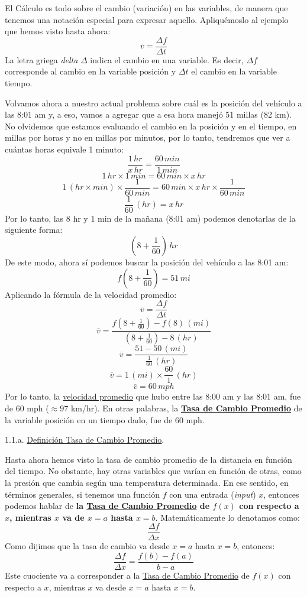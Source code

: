 \documentclass[12pt]{article}
\begin{document}
El Cálculo es todo sobre el cambio (variación) en las variables, de manera que tenemos una notación especial para expresar aquello. Apliquémoslo al ejemplo que hemos visto hasta ahora:
\[\overline{v} = \frac{\Delta f}{\Delta t}\]
La letra griega \textit{delta} $\Delta$ indica el cambio en una variable. Es decir, $\Delta f$ corresponde al cambio en la variable posición y $\Delta t$ el cambio en la variable tiempo.

Volvamos ahora a nuestro actual problema sobre cuál es la posición del vehículo a las 8:01 am y, a eso, vamos a agregar que a esa hora manejó 51 millas (82 km). No olvidemos que estamos evaluando el cambio en la posición y en el tiempo, en millas por horas y no en millas por minutos, por lo tanto, tendremos que ver a cuántas horas equivale 1 minuto:
\[\frac{1 \, hr}{x \, hr} = \frac{60 \, min}{1 \, min}\]
\[1 \, hr \times 1 \, min = 60 \, min \times x \, hr\]
\[1 \, (hr \times min) \times \frac{1}{60 \, min} = 60 \, min \times x \, hr \times \frac{1}{60 \, min}\]
\[\frac{1}{60} \, (hr) = x \, hr\]
Por lo tanto, las 8 hr y 1 min de la mañana (8:01 am) podemos denotarlas de la siguiente forma:
\[\left(8 + \frac{1}{60} \right) \, hr\]
De este modo, ahora sí podemos buscar la posición del vehículo a las 8:01 am:
\[f\left(8 + \frac{1}{60}\right) = 51 \, mi\]
Aplicando la fórmula de la velocidad promedio:
\[\overline{v} = \frac{\Delta f}{\Delta t}\]
\[\overline{v} = \frac{f\left(8 + \frac{1}{60}\right) - f(8) \, (mi)}{\left(8 + \frac{1}{60}\right) - 8 \, (hr)}\]
\[\overline{v} = \frac{51 - 50 \, (mi)}{\frac{1}{60} \, (hr)}\]
\[\overline{v} = 1 \, (mi) \times \frac{60}{1} \, (hr)\]
\[\overline{v} = 60 \, mph\]
Por lo tanto, la \underline{velocidad promedio} que hubo entre las 8:00 am y las 8:01 am, fue de 60 mph ($\approx 97$ km/hr). En otras palabras, la \textbf{\underline{Tasa de Cambio Promedio}} de la variable posición en un tiempo dado, fue de 60 mph.

1.1.a. \underline{Definición Tasa de Cambio Promedio}.

Hasta ahora hemos visto la tasa de cambio promedio de la distancia en función del tiempo. No obstante, hay otras variables que varían en función de otras, como la presión que cambia según una temperatura determinada. En ese sentido, en términos generales, si tenemos una función $f$ con una entrada (\textit{input}) $x$, entonces podemos hablar de \textbf{la \underline{Tasa de Cambio Promedio} de $f(x)$ con respecto a $x$, mientras $x$ va de $x = a$ hasta $x = b$}. Matemáticamente lo denotamos como:
\[\frac{\Delta f}{\Delta x}\]
Como dijimos que la tasa de cambio va desde $x = a$ hasta $x = b$, entonces:
\[\frac{\Delta f}{\Delta x} = \frac{f(b) - f(a)}{b - a}\]
Este cuociente va a corresponder a la \underline{Tasa de Cambio Promedio} de $f(x)$ con respecto a $x$, mientras $x$ va desde $x = a$ hasta $x = b$.
\end{document}
